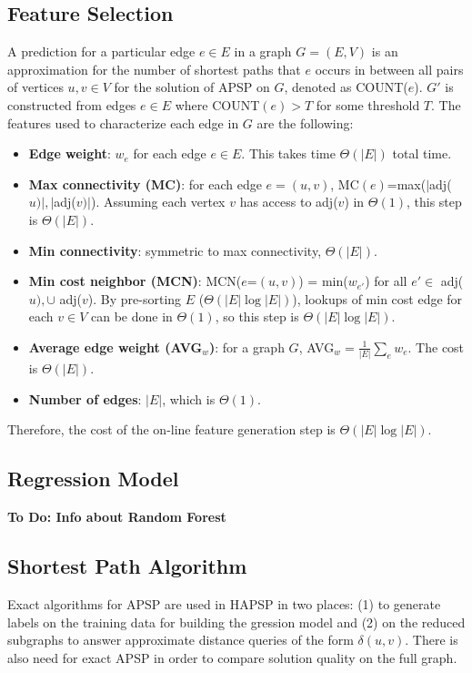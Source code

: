 \documentclass[10.5pt,journal]{IEEEtran}
\begin{document}
\subsection{Feature Selection}
	A prediction for a particular edge $e\in E$ in a graph $G=(E,V)$ 
	is an approximation for the number of shortest paths 
	that $e$ occurs in between all pairs of vertices $u,v\in V$ for the solution of APSP on $G$, denoted as 
	COUNT($e$). $G'$ is constructed from edges $e\in E$ where COUNT$(e)>T$ for some threshold $T$. 
	The features used to characterize each edge in $G$ are the following:
	\begin{itemize}
		\item {\bf{Edge weight}}: $w_e$ for each edge $e\in E$. This takes time $\Theta(|E|)$ total time.
		\item{\bf{Max connectivity (MC)}}: for each edge $e=(u,v)$, MC$(e)$=max($|$adj($u)|,|$adj($v)|$).
			Assuming each vertex $v$ has access to adj($v$) in $\Theta(1)$, this step is $\Theta(|E|)$.
		\item{\bf{Min connectivity}}: symmetric to max connectivity, $\Theta(|E|)$. 
		\item{\bf{Min cost neighbor (MCN)}}: MCN($e$=$(u,v)$) = min($w_{e'}$) for all $e'\in$ adj($u),\cup$
			adj($v$). By pre-sorting $E$ ($\Theta(|E|\log|E|)$), lookups of min cost edge for each $v\in V$
			can be done in $\Theta(1)$, so this step is $\Theta(|E|\log|E|)$.
		\item{\bf{Average edge weight (AVG$_w$)}}: for a graph $G$, AVG$_w = \frac{1}{|E|}\sum_{e}w_e$.
			The cost is $\Theta(|E|)$.
		\item{\bf{Number of edges}}: $|E|$, which is $\Theta(1)$.
	\end{itemize}
	Therefore, the cost of the on-line feature generation step is $\Theta(|E|\log|E|)$.
	
\subsection{Regression Model}
	{\bf{To Do: Info about Random Forest}}

\subsection{Shortest Path Algorithm}
	Exact algorithms for APSP are used in HAPSP in two places: (1) to generate labels on the training
	data for building the gression model and (2) on the reduced subgraphs to answer approximate
	distance queries of the form $\delta(u,v)$. There is also need for exact APSP in order to
	compare solution quality on the full graph. \\
	
\end{document}
